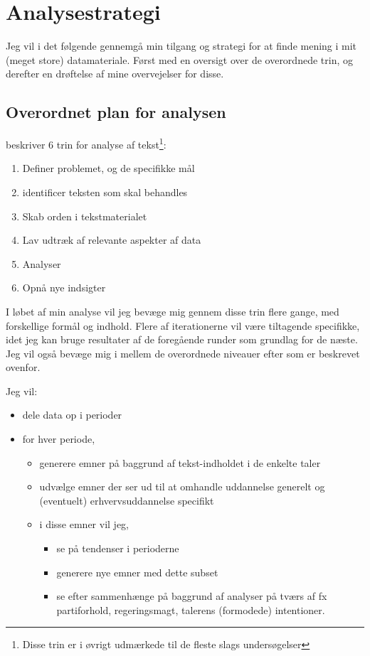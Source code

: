 \chapter{Analysestrategi}\label{chap:strategy}

Jeg vil i det følgende gennemgå min tilgang og strategi for at finde mening i mit (meget store) datamateriale.
Først med en oversigt over de overordnede trin, og derefter en drøftelse af mine overvejelser for disse. 

\section{Overordnet plan for analysen}\label{sec:plan}

\autocite[s. 17]{kwartlerTextMiningPractice2017} beskriver 6 trin for analyse af tekst\footnote{Disse
  trin er i øvrigt udmærkede til de fleste slags undersøgelser}:
\begin{enumerate}
  \item
    Definer problemet, og de specifikke mål
  \item
    identificer teksten som skal behandles
  \item
    Skab orden i tekstmaterialet
  \item
    Lav udtræk af relevante aspekter af data
  \item
    Analyser
  \item
    Opnå nye indsigter
\end{enumerate}

I løbet af min analyse vil jeg bevæge mig gennem disse trin flere gange, med forskellige formål og indhold.
Flere af iterationerne vil være tiltagende specifikke, idet jeg kan bruge resultater af de foregående runder som grundlag for de næste.
Jeg vil også bevæge mig i mellem de overordnede niveauer efter \autocite{evansMachineTranslationMining2016} som er beskrevet ovenfor.

Jeg vil:

\begin{itemize}


  \item
    dele data op i perioder
  \item
    for hver periode,
    \begin{itemize}
      \item
        generere emner på baggrund af tekst-indholdet i de enkelte taler
      \item
        udvælge emner der ser ud til at omhandle uddannelse generelt og (eventuelt) erhvervsuddannelse specifikt
      \item
        i disse emner vil jeg, 
        \begin{itemize}
          \item
            se på tendenser i perioderne
          \item
            generere nye emner med dette subset
          \item
            se efter sammenhænge på baggrund af analyser på tværs af fx partiforhold, regeringsmagt, talerens (formodede) intentioner.
        \end{itemize}
    \end{itemize}
\end{itemize}

